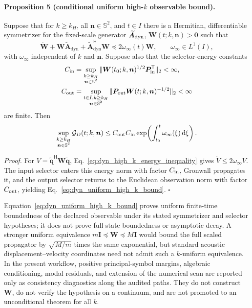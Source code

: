 \paragraph{Proposition 5 (conditional uniform high-$k$ observable bound).}
Suppose that for $k\ge k_H$, all $\boldsymbol n\in\mathbb S^2$, and
$t\in I$ there is a Hermitian, differentiable symmetrizer for the fixed-scale
generator $\widetilde{\boldsymbol A}_{\rm dyn}$,
$\boldsymbol W(t;k,\boldsymbol n)>\boldsymbol0$ such that
\begin{equation}
 \dot{\boldsymbol W}
 +\boldsymbol W\widetilde{\boldsymbol A}_{\mathrm{dyn}}
 +\widetilde{\boldsymbol A}_{\mathrm{dyn}}^{\mathsf H}\boldsymbol W
 \preceq2\omega_\infty(t)\boldsymbol W,
 \qquad \omega_\infty\in L^1(I),
 \label{eq:dyn_high_k_energy_inequality}
\end{equation}
with $\omega_\infty$ independent of $k$ and $\boldsymbol n$.  Suppose also
that the selector-energy constants
\begin{align}
 C_{\rm in}
 &=\sup_{\substack{k\ge k_H\\\boldsymbol n\in\mathbb S^2}}
 \|\boldsymbol W(t_0;k,\boldsymbol n)^{1/2}
   \boldsymbol P_{\rm in}^{\mathsf T}\|_2<\infty,\\
 C_{\rm out}
 &=\sup_{\substack{t\in I,k\ge k_H\\\boldsymbol n\in\mathbb S^2}}
 \|\boldsymbol P_{\rm out}
   \boldsymbol W(t;k,\boldsymbol n)^{-1/2}\|_2<\infty
 \label{eq:dyn_high_k_selector_constants}
\end{align}
are finite.  Then
\begin{equation}
 \sup_{\substack{k\ge k_H\\\boldsymbol n\in\mathbb S^2}}
 \mathcal G_D(t;k,\boldsymbol n)
 \le
 C_{\rm out}C_{\rm in}
 \exp\!\left(\int_{t_0}^{t}\omega_\infty(\xi)\,\mathrm d\xi\right).
 \label{eq:dyn_uniform_high_k_bound}
\end{equation}

\emph{Proof.}
For $V=\widetilde{\boldsymbol q}^{\mathsf H}
\boldsymbol W\widetilde{\boldsymbol q}$,
Eq.~\eqref{eq:dyn_high_k_energy_inequality} gives
$\dot V\le2\omega_\infty V$.  The input selector enters this energy norm with
factor $C_{\rm in}$, Gronwall propagates it, and the output selector returns to
the Euclidean observation norm with factor $C_{\rm out}$, yielding
Eq.~\eqref{eq:dyn_uniform_high_k_bound}. \hfill$\square$

Equation~\eqref{eq:dyn_uniform_high_k_bound} proves uniform finite-time
boundedness of the declared observable under its stated symmetrizer and
selector hypotheses; it does not prove full-state boundedness or asymptotic
decay.  A stronger uniform equivalence
$m\boldsymbol I\preceq\boldsymbol W\preceq M\boldsymbol I$ would bound the
full scaled propagator by $\sqrt{M/m}$ times the same exponential, but standard
acoustic displacement--velocity coordinates need not admit such a $k$-uniform
equivalence.  In the present workflow, positive principal-symbol margins,
algebraic conditioning, modal residuals, and extension of the numerical scan
are reported only as consistency diagnostics along the audited paths.  They do
not construct $\boldsymbol W$, do not verify the hypothesis on a continuum,
and are not promoted to an unconditional theorem for all $k$.


